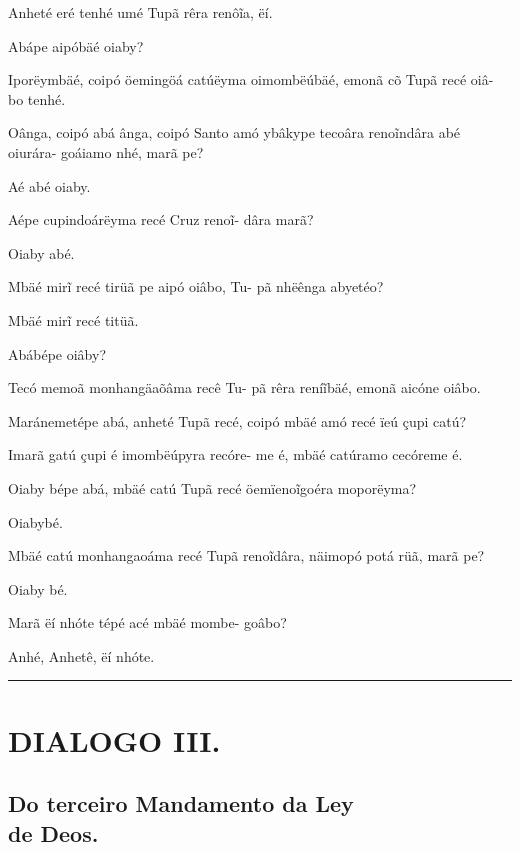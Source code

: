 \documentclass[openany,titlepage,12pt]{book}
\begin{document}
\begin{altereven}
    \item Anheté eré tenhé umé Tupã rêra renô\~ia,
        ëí.
    \item Abápe aipóbäé oiaby?
    \item Iporëymbäé, coipó öemingöá catúëyma
        oimombëúbäé, emonã cõ Tupã recé oiâ-
        bo tenhé.
    \item Oânga, coipó abá ânga, coipó Santo amó
        ybâkype tecoâra reno\~indâra abé oiurára-
        goáiamo nhé, marã pe?
    \item Aé abé oiaby.
    \item Aépe cupindoárëyma recé Cruz reno\~i-
        dâra marã?
    \item Oiaby abé.
    \item Mbäé mir\~i recé tirüã pe aipó oiâbo, Tu-
        pã nhëênga abyetéo?
    \item Mbäé mir\~i recé titüã.
    \item Abábépe oiâby?
    \item Tecó memoã monhangäaõâma recê Tu-\pagebreak
    \newpage
        pã rêra rení\~ibäé, emonã aicóne oiâbo.
    \item Maránemetépe abá, anheté Tupã recé,
        coipó mbäé amó recé ïeú çupi catú?
    \item Imarã gatú çupi é imombëúpyra recóre-
        me é, mbäé catúramo cecóreme é.
    \item Oiaby bépe abá, mbäé catú Tupã recé
        öemïeno\~igoéra moporëyma?
    \item Oiabybé.
    \item Mbäé catú monhangaoáma recé Tupã
        reno\~idâra, näimopó potá rüã, marã pe?
    \item Oiaby bé.
    \item Marã ëí nhóte tépé acé mbäé mombe-
        goâbo?
    \item Anhé, Anhetê, ëí nhóte.
\end{altereven}

\vspace{15pt}
\par\noindent\rule{\textwidth}{0.4pt}
\unskip\vspace*{2pt}
\section{DIALOGO III.}
\unskip\vspace{2pt}
\subsection{Do terceiro Mandamento da Ley \\de Deos.}
\end{document}
